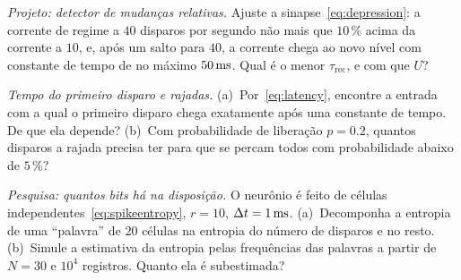 \begin{exercise}[\lvlB]
\label{ex:04:5}
\emph{Projeto: detector de mudanças relativas.} Ajuste a sinapse~\eqref{eq:depression}: a corrente de regime a $40$ disparos por segundo não mais que $10\,\%$ acima da corrente a $10$, e, após um salto para $40$, a corrente chega ao novo nível com constante de tempo de no máximo $50\,\text{ms}$. Qual é o menor $\tau_{\text{rec}}$, e com que $U$?
\end{exercise}

\begin{exercise}[\lvlA]
\label{ex:04:6}
\emph{Tempo do primeiro disparo e rajadas.} (a)~Por~\eqref{eq:latency}, encontre a entrada com a qual o primeiro disparo chega exatamente após uma constante de tempo. De que ela depende? (b)~Com probabilidade de liberação $p=0.2$, quantos disparos a rajada precisa ter para que se percam todos com probabilidade abaixo de $5\,\%$?
\end{exercise}

\begin{exercise}[\lvlC]
\label{ex:04:7}
\emph{Pesquisa: quantos bits há na disposição.} O neurônio é feito de células independentes~\eqref{eq:spikeentropy}, $r=10$, $\Delta t=1\,\text{ms}$. (a)~Decomponha a entropia de uma ``palavra'' de $20$ células na entropia do número de disparos e no resto. (b)~Simule a estimativa da entropia pelas frequências das palavras a partir de $N=30$ e $10^4$ registros. Quanto ela é subestimada?
\end{exercise}
